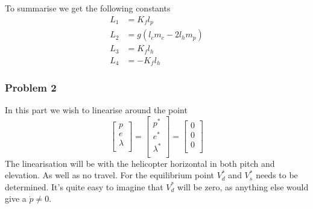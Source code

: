 To summarise we get the following constants
\begin{subequations}\label{eq:P1_constants_for_non-linear_eq}
    \begin{align}
        L_1 &= K_f l_p \label{eq:P1_L1} \\
        L_2 &= g (l_c m_c - 2 l_h m_p) \label{eq:P1_L2} \\
        L_3 &= K_f l_h \label{eq:P1_L3} \\
        L_4 &= -K_f l_h \label{eq:P1_L4}
    \end{align}
\end{subequations}

\subsubsection{Problem 2}
In this part we wish to linearise around the point
\begin{equation*}
    \begin{bmatrix}
        p \\
        e \\
        \lambda \\
    \end{bmatrix}
    =
    \begin{bmatrix}
        p^* \\
        e^* \\
        \lambda^* \\
    \end{bmatrix}
    =
    \begin{bmatrix}
        0 \\
        0 \\
        0 \\
    \end{bmatrix}
\end{equation*}
The linearisation will be with the helicopter horizontal in both pitch and elevation. As well as no travel. For the equilibrium point $V_d^*$ and $V_s^*$ needs to be determined. It's quite easy to imagine that $V_d^*$ will be zero, as anything else would give a $\dot{p} \neq 0$.

